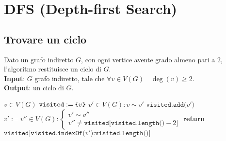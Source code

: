 \documentclass[14pt]{extreport}
\theoremstyle{definition}
\theoremstyle{definition}
\begin{document}
\section{DFS (Depth-first Search)}

\subsection{Trovare un ciclo}

\begin{algorithm}[H]
    \caption{
        Dato un grafo indiretto $G$, con ogni vertice avente grado almeno pari a $2$, l'algoritmo restituisce un ciclo di $G$.\\
        \textbf{Input}: $G$ grafo indiretto, tale che $\forall v \in V(G) \quad \deg(v) \ge 2$.\\
        \textbf{Output}: un ciclo di $G$.
    }

    \begin{algorithmic}[1]
            \State $v \in V(G)$ 
            \State $\texttt{visited} := \verb|{|v\verb|}|$ 
            \State $v' \in V(G) : v \sim v'$
             
                \State $\texttt{visited.add(}v'\texttt{)}$
                \State $v' := v'' \in V(G) : \left \{ \begin{array}{l}v' \sim v'' \\ v'' \neq \texttt{visited[visited.length()} - 2\texttt{]} \end{array} \right.$
            \EndWhile
            \State \textbf{return} $\texttt{visited[visited.indexOf(}v'\texttt{)} \texttt{:} \texttt{visited.length()]}$
        \EndFunction
    \end{algorithmic}
\end{algorithm}
\end{document}
